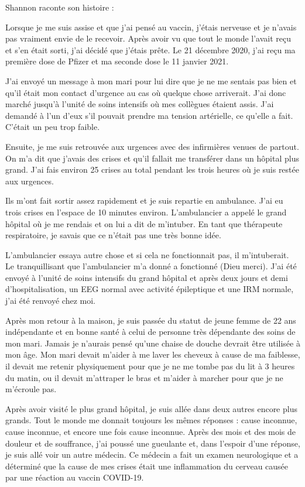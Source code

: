 Shannon raconte son histoire :

Lorsque je me suis assise et que j'ai pensé au vaccin, j'étais nerveuse et je
n'avais pas vraiment envie de le recevoir. Après avoir vu que tout le monde
l'avait reçu et s'en était sorti, j'ai décidé que j'étais prête. Le 21 décembre
2020, j'ai reçu ma première dose de Pfizer et ma seconde dose le 11 janvier
2021.

J'ai envoyé un message à mon mari pour lui dire que je ne me sentais pas bien et
qu'il était mon contact d'urgence au cas où quelque chose arriverait. J'ai donc
marché jusqu'à l'unité de soins intensifs où mes collègues étaient assis. J'ai
demandé à l'un d'eux s'il pouvait prendre ma tension artérielle, ce qu'elle a
fait. C'était un peu trop faible.

Ensuite, je me suis retrouvée aux urgences avec des infirmières venues de
partout. On m'a dit que j'avais des crises et qu'il fallait me transférer dans
un hôpital plus grand. J'ai fais environ 25 crises au total pendant les trois
heures où je suis restée aux urgences.

Ils m'ont fait sortir assez rapidement et je suis repartie en ambulance. J'ai eu
trois crises en l'espace de 10 minutes environ. L'ambulancier a appelé le grand
hôpital où je me rendais et on lui a dit de m'intuber. En tant que thérapeute
respiratoire, je savais que ce n'était pas une très bonne idée.

L'ambulancier essaya autre chose et si cela ne fonctionnait pas, il
m'intuberait. Le tranquillisant que l'ambulancier m'a donné a fonctionné (Dieu
merci). J'ai été envoyé à l'unité de soins intensifs du grand hôpital et après
deux jours et demi d'hospitalisation, un EEG normal avec activité épileptique et
une IRM normale, j'ai été renvoyé chez moi.

Après mon retour à la maison, je suis passée du statut de jeune femme de 22 ans
indépendante et en bonne santé à celui de personne très dépendante des soins de
mon mari. Jamais je n'aurais pensé qu'une chaise de douche devrait être utilisée
à mon âge. Mon mari devait m'aider à me laver les cheveux à cause de ma
faiblesse, il devait me retenir physiquement pour que je ne me tombe pas du lit
à 3 heures du matin, ou il devait m'attraper le bras et m'aider à marcher pour
que je ne m'écroule pas.

Après avoir visité le plus grand hôpital, je suis allée dans deux autres encore
plus grands. Tout le monde me donnait toujours les mêmes réponses : cause
inconnue, cause inconnue, et encore une fois cause inconnue. Après des mois et
des mois de douleur et de souffrance, j'ai poussé une gueulante et, dans
l'espoir d'une réponse, je suis allé voir un autre médecin. Ce médecin a fait un
examen neurologique et a déterminé que la cause de mes crises était une
inflammation du cerveau causée par une réaction au vaccin COVID-19.

